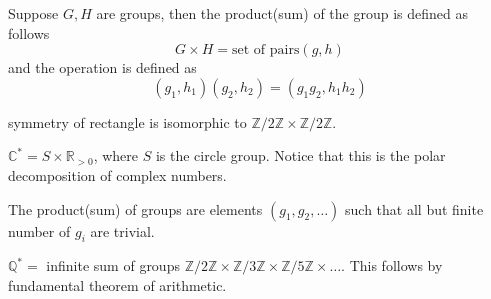 \documentclass[12pt,letterpaper]{article}
\renewcommand{\b}{\mathbb}
\begin{document}
\begin{definition}
	Suppose $G,H$ are groups, then the product(sum) of the group is defined as follows
	\[ G \times H = \text{set of pairs} (g,h) \]
	and the operation is defined as 
	\[ (g_1,h_1)(g_2,h_2) = (g_1g_2,h_1h_2)\]
\end{definition}
\begin{example}
	symmetry of rectangle is isomorphic to $\b Z/2 \b Z \times \b Z/2 \b Z$.
\end{example}
\begin{example}
	$\b C^* = S \times \b R_{>0}$, where $S$ is the circle group. Notice that this is the polar decomposition of complex numbers.
\end{example}
\begin{definition}
	The product(sum) of groups are elements $(g_1, g_2, \ldots)$ such that all but finite number of $g_i$ are trivial.
\end{definition}
\begin{example}
	$\b Q^* = $ infinite sum of groups $\b Z/2 \b Z \times \b Z /3 \b Z \times \b Z /5 \b Z \times \ldots$. This follows by fundamental theorem of arithmetic.
\end{example}
\end{document}
